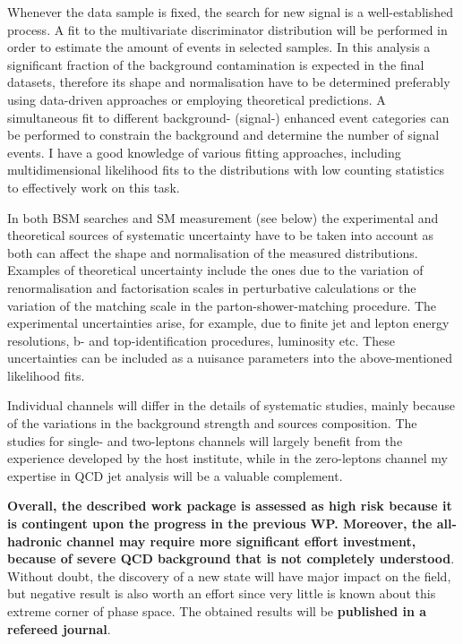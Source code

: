 Whenever the data sample is fixed, the search for new signal is a well-established process. A fit to the multivariate discriminator distribution will be performed in order to estimate the amount of \fourtop events in selected samples. In this analysis a significant fraction of the background contamination is expected in the final datasets, therefore its shape and normalisation have to be determined preferably using data-driven approaches or employing theoretical predictions. A simultaneous fit to different background- (signal-) enhanced event categories can be performed to constrain the background and determine the number of signal events. I have a good knowledge of various fitting approaches, including multidimensional likelihood fits to the distributions with low counting statistics to effectively work on this task.

In both BSM searches and SM measurement (see below) the experimental and theoretical sources of systematic uncertainty have to be taken into account as both can affect the shape and normalisation of the measured distributions. Examples of theoretical uncertainty include the ones due to the variation of renormalisation and factorisation scales in perturbative calculations or the variation of the matching scale in the parton-shower-matching procedure. The experimental uncertainties arise, for example, due to finite jet and lepton energy resolutions, b- and top-identification procedures, luminosity etc. These uncertainties can be included as a nuisance parameters into the above-mentioned likelihood fits.

Individual channels will differ in the details of systematic studies, mainly because of the variations in the background strength and sources composition. The studies for single- and two-leptons channels will largely benefit from the experience developed by the host institute, while in the zero-leptons channel my expertise in QCD jet analysis will be a valuable complement.

\textbf{Overall, the described work package is assessed as high risk because it is contingent upon the progress in the previous WP. Moreover, the all-hadronic channel may require more significant effort investment, because of severe QCD background that is not completely understood}. Without doubt, the discovery of a new state will have major impact on the field, but negative result is also worth an effort since very little is known about this extreme corner of phase space. The obtained results will be \textbf{published in a refereed journal}.